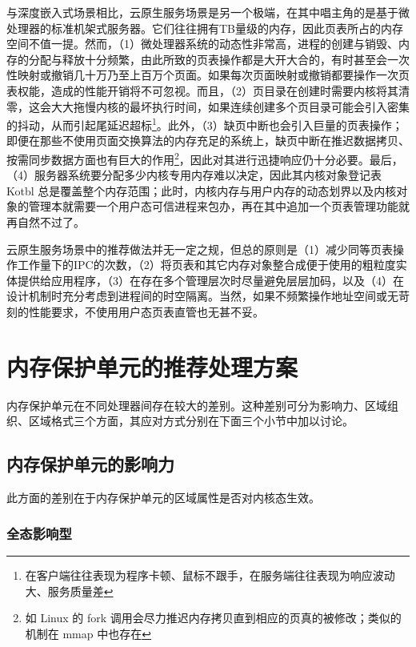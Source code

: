 与深度嵌入式场景相比，云原生服务场景是另一个极端，在其中唱主角的是基于微处理器的标准机架式服务器。它们往往拥有TB量级的内存，因此页表所占的内存空间不值一提。然而，（1）微处理器系统的动态性非常高，进程的创建与销毁、内存的分配与释放十分频繁，由此所致的页表操作都是大开大合的，有时甚至会一次性映射或撤销几十万乃至上百万个页面。如果每次页面映射或撤销都要操作一次页表权能，造成的性能开销将不可忽视。而且，（2）页目录在创建时需要内核将其清零，这会大大拖慢内核的最坏执行时间，如果连续创建多个页目录可能会引入密集的抖动，从而引起尾延迟超标\footnote{在客户端往往表现为程序卡顿、鼠标不跟手，在服务端往往表现为响应波动大、服务质量差}。此外，（3）缺页中断也会引入巨量的页表操作；即便在那些不使用页面交换算法的内存充足的系统上，缺页中断在推迟数据拷贝、按需同步数据方面也有巨大的作用\footnote{如 Linux 的 fork 调用会尽力推迟内存拷贝直到相应的页真的被修改；类似的机制在 mmap 中也存在}，因此对其进行迅捷响应仍十分必要。最后，（4）服务器系统要分配多少内核专用内存难以决定，因此其内核对象登记表 Kotbl 总是覆盖整个内存范围；此时，内核内存与用户内存的动态划界以及内核对象的管理本就需要一个用户态可信进程来包办，再在其中追加一个页表管理功能就再自然不过了。

云原生服务场景中的推荐做法并无一定之规，但总的原则是（1）减少同等页表操作工作量下的IPC的次数，（2）将页表和其它内存对象整合成便于使用的粗粒度实体提供给应用程序，（3）在存在多个管理层次时尽量避免层层加码，以及（4）在设计机制时充分考虑到进程间的时空隔离。当然，如果不频繁操作地址空间或无苛刻的性能要求，不使用用户态页表直管也无甚不妥。

\section{内存保护单元的推荐处理方案}\label{sec:9-mpu-recommendations}

内存保护单元在不同处理器间存在较大的差别。这种差别可分为影响力、区域组织、区域格式三个方面，其应对方式分别在下面三个小节中加以讨论。

\subsection{内存保护单元的影响力}\label{subsec:9-mpu-influence}

此方面的差别在于内存保护单元的区域属性是否对内核态生效。

\subsubsection{全态影响型}\label{subsubsec:9-mpu-all-mode-affecting}

